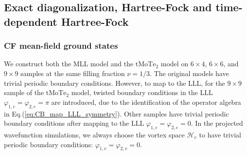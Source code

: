 \subsection{Exact diagonalization, Hartree-Fock and time-dependent Hartree-Fock}
\subsubsection{CF mean-field ground states}

We construct both the MLL model and the $\mathrm{tMoTe_2}$ model on $6\times4$, $6\times6$, and $9\times 9$ samples at the same filling fraction $\nu=1/3$. The original models have trivial periodic boundary conditions. However, to map to the LLL, for the $9\times 9$ sample of the $\mathrm{tMoTe_2}$ model, twisted boundary conditions in the LLL $\varphi_{1,e}=\varphi_{2,e}=\pi$ are introduced, due to the identification of the operator algebra in Eq.(\ref{eq:CB_map_LLL_symmetry}). Other samples have trivial periodic boundary conditions after mapping to the LLL $\varphi_{1,e}=\varphi_{2,e}=0$. In the projected wavefunction simulations,  we always choose the vortex space $\mathcal H_v$ to have trivial periodic boundary conditions: $\varphi_{1,v}=\varphi_{2,v}=0$.



